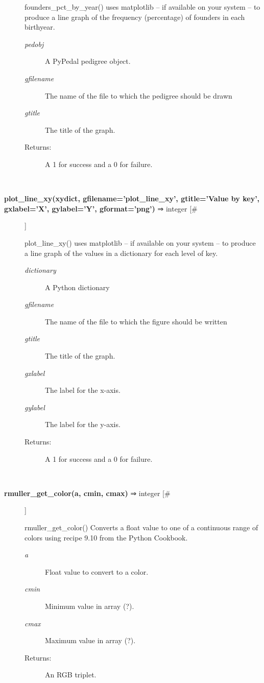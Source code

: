 \begin{description}
 founders\_pct\_by\_year() uses matplotlib -- if available on your system -- to produce a line graph of the frequency (percentage) of founders in each birthyear.
\begin{description}
\item[\emph{pedobj}
] A PyPedal pedigree object.
\item[\emph{gfilename}
] The name of the file to which the pedigree should be drawn
\item[\emph{gtitle}
] The title of the graph.
\item[Returns:] A 1 for success and a 0 for failure.

\end{description}
\\ 

\item[\textbf{plot\_line\_xy(xydict, gfilename='plot\_line\_xy', gtitle='Value by key', gxlabel='X', gylabel='Y', gformat='png')}
 ⇒ integer [\#]]

 plot\_line\_xy() uses matplotlib -- if available on your system -- to produce a line graph of the values in a dictionary for each level of key.
\begin{description}
\item[\emph{dictionary}
] A Python dictionary
\item[\emph{gfilename}
] The name of the file to which the figure should be written
\item[\emph{gtitle}
] The title of the graph.
\item[\emph{gxlabel}
] The label for the x-axis.
\item[\emph{gylabel}
] The label for the y-axis.
\item[Returns:] A 1 for success and a 0 for failure.

\end{description}
\\ 

\item[\textbf{rmuller\_get\_color(a, cmin, cmax)}
 ⇒ integer [\#]]

 rmuller\_get\_color() Converts a float value to one of a continuous range of colors using recipe 9.10 from the Python Cookbook.
\begin{description}
\item[\emph{a}
] Float value to convert to a color.
\item[\emph{cmin}
] Minimum value in array (?).
\item[\emph{cmax}
] Maximum value in array (?).
\item[Returns:] An RGB triplet.


\end{description}
\end{description}
